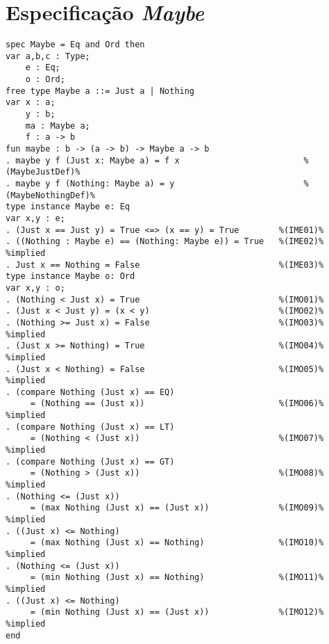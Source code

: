 \section{Especificação \textit{Maybe}}
\label{appendix:strictSpec:maybe}
\begin{Verbatim}
spec Maybe = Eq and Ord then
var a,b,c : Type;
    e : Eq;
    o : Ord;
free type Maybe a ::= Just a | Nothing
var x : a;
    y : b;
    ma : Maybe a;
    f : a -> b
fun maybe : b -> (a -> b) -> Maybe a -> b
. maybe y f (Just x: Maybe a) = f x                         %(MaybeJustDef)%
. maybe y f (Nothing: Maybe a) = y                          %(MaybeNothingDef)%
type instance Maybe e: Eq
var x,y : e; 
. (Just x == Just y) = True <=> (x == y) = True        %(IME01)%
. ((Nothing : Maybe e) == (Nothing: Maybe e)) = True   %(IME02)% %implied
. Just x == Nothing = False                            %(IME03)%
type instance Maybe o: Ord
var x,y : o;
. (Nothing < Just x) = True                            %(IMO01)%
. (Just x < Just y) = (x < y)                          %(IMO02)%
. (Nothing >= Just x) = False                          %(IMO03)% %implied
. (Just x >= Nothing) = True                           %(IMO04)% %implied
. (Just x < Nothing) = False                           %(IMO05)% %implied
. (compare Nothing (Just x) == EQ)
     = (Nothing == (Just x))                           %(IMO06)% %implied
. (compare Nothing (Just x) == LT)
     = (Nothing < (Just x))                            %(IMO07)% %implied
. (compare Nothing (Just x) == GT)
     = (Nothing > (Just x))                            %(IMO08)% %implied
. (Nothing <= (Just x))
     = (max Nothing (Just x) == (Just x))              %(IMO09)% %implied
. ((Just x) <= Nothing)
     = (max Nothing (Just x) == Nothing)               %(IMO10)% %implied
. (Nothing <= (Just x))
     = (min Nothing (Just x) == Nothing)               %(IMO11)% %implied
. ((Just x) <= Nothing)
     = (min Nothing (Just x) == (Just x))              %(IMO12)% %implied
end
\end{Verbatim}

